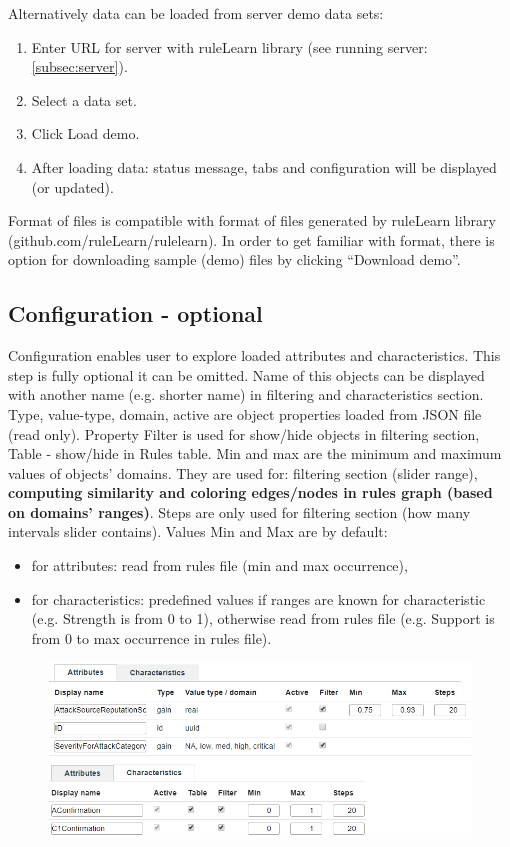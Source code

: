\documentclass[12pt]{article}
\begin{document}
Alternatively data can be loaded from server demo data sets:
\begin{enumerate}
    \setlength\itemsep{0em}
    \item Enter URL for server with ruleLearn library (see running server: \ref{subsec:server}).
    \item Select a data set.
    \item Click Load demo.
    \item After loading data: status message, tabs and configuration will be displayed (or updated).
\end{enumerate}

Format of files is compatible with format of files generated by ruleLearn library \\(github.com/ruleLearn/rulelearn). In order to get familiar with format, there is option for downloading sample (demo) files by clicking ``Download demo''.

\subsection{Configuration - optional}

Configuration enables user to explore loaded attributes and characteristics. This step is fully optional it can be omitted. Name of this objects can be displayed with another name (e.g. shorter name) in filtering and characteristics section. Type, value-type, domain, active are object properties loaded from JSON file (read only). Property Filter is used for show/hide objects in filtering section, Table - show/hide in Rules table. Min and max are the minimum and maximum values of objects' domains. They are used for: filtering section (slider range), \textbf{computing similarity and coloring edges/nodes in rules graph (based on domains' ranges)}. Steps are only used for filtering section (how many intervals slider contains). Values Min and Max are by default:
\begin{itemize}
    \setlength\itemsep{0em}
    \item for attributes: read from rules file (min and max occurrence),
    \item for characteristics: predefined values if ranges are known for characteristic (e.g. Strength is from 0 to 1), otherwise read from rules file (e.g. Support is from 0 to max occurrence in rules file).
\end{itemize}

\begin{figure}[H]
    \centering
    \includegraphics[width=\textwidth]{figures/B-configure.png}
\end{figure}
\end{document}
